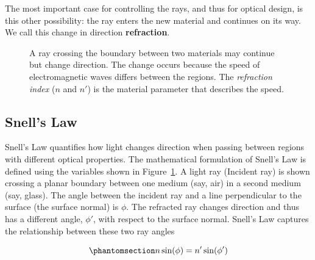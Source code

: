 \documentclass[
  letterpaper,
]{book}
\begin{document}
The most important case for controlling the rays, and thus for optical
design, is this other possibility: the ray enters the new material and
continues on its way. We call this change in direction
\textbf{refraction}.

\begin{figure}


\caption{\label{fig-snell-law}A ray crossing the boundary between two
materials may continue but change direction. The change occurs because
the speed of electromagnetic waves differs between the regions. The
\emph{refraction index} (\(n\) and \(n'\)) is the material parameter
that describes the speed.}

\end{figure}%

\subsection{Snell's Law}\label{snells-law}

Snell's Law quantifies how light changes direction when passing between
regions with different optical properties. The mathematical formulation
of Snell's Law is defined using the variables shown in
Figure~\ref{fig-snell-law}. A light ray (Incident ray) is shown crossing
a planar boundary between one medium (say, air) in a second medium (say,
glass). The angle between the incident ray and a line perpendicular to
the surface (the surface normal) is \(\phi\). The refracted ray changes
direction and thus has a different angle, \(\phi '\), with respect to
the surface normal. Snell's Law captures the relationship between these
two ray angles

\begin{equation}\phantomsection\label{eq-snell}{ 
n \sin(\phi) = n' \sin(\phi') 
}\end{equation}
\end{document}
